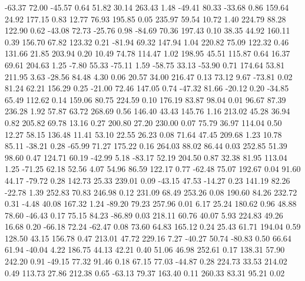   -63.37   72.00  -45.57    0.64
   51.82   30.14  263.43    1.48
  -49.41   80.33  -33.68    0.86
  159.64   24.92  177.15    0.83
   12.77   76.93  195.85    0.05
  235.97   59.54   10.72    1.40
  224.79   88.28  122.90    0.62
  -43.08   72.73  -25.76    0.98
  -84.69   70.36  197.43    0.10
   38.35   44.92  160.11    0.39
  156.70   67.82  123.32    0.21
  -81.94   69.32  147.94    1.04
  220.82   75.09  122.32    0.46
  131.66   21.85  203.94    0.20
   10.49   74.78  114.47    1.02
  198.95   45.51  115.87    0.64
   16.37   69.61  204.63    1.25
   -7.80   55.33  -75.11    1.59
  -58.75   33.13  -53.90    0.71
  174.64   53.81  211.95    3.63
  -28.56   84.48    4.30    0.06
   20.57   34.00  216.47    0.13
   73.12    9.67  -73.81    0.02
   81.24   62.21  156.29    0.25
  -21.00   72.46  147.05    0.74
  -47.32   81.66  -20.12    0.20
  -34.85   65.49  112.62    0.14
  159.06   80.75  224.59    0.10
  176.19   83.87   98.04    0.01
   96.67   87.39  236.28    1.92
   57.87   63.72  268.69    0.56
  146.40   43.43  145.76    1.16
  213.02   45.28   36.94    0.82
  205.82   69.78   13.16    0.27
  200.80   27.20  230.00    0.07
   75.79   36.97  114.04    0.50
   12.27   58.15  136.48   11.41
   53.10   22.55   26.23    0.08
   71.64   47.45  209.68    1.23
   10.78   85.11  -38.21    0.28
  -65.99   71.27  175.22    0.16
  264.03   88.02   86.44    0.03
  252.85   51.39   98.60    0.47
  124.71   60.19  -42.99    5.18
  -83.17   52.19  204.50    0.87
   32.38   81.95  113.04    1.25
  -71.25   62.18   52.56    4.07
   54.96   86.59  122.17    0.77
  -62.48   75.07  192.67    0.04
   91.60   44.17  -79.72    0.28
  142.73   25.33  239.01    0.09
  -43.15   47.53  -14.27    0.23
  141.19   82.26  -22.78    1.39
  252.83   70.83  246.98    0.12
  231.09   68.49  253.26    0.08
  190.60   84.26  232.72    0.31
   -4.48   40.08  167.32    1.24
  -89.20   79.23  257.96    0.01
    6.17   25.24  180.62    0.96
   48.88   78.60  -46.43    0.17
   75.15   84.23  -86.89    0.03
  218.11   60.76   40.07    5.93
  224.83   49.26   16.68    0.20
  -66.18   72.24  -62.47    0.08
   73.60   64.83  165.12    0.24
   25.43   61.71  194.04    0.59
  128.50   43.15  156.78    0.47
  213.01   47.72  229.16    7.27
  -40.27   50.74  -80.83    0.50
   66.64   61.94  -40.04    4.22
  186.75   44.13   42.21    0.40
   51.06   46.98  252.61    0.17
  138.31   57.90  242.20    0.91
  -49.15   77.32   91.46    0.18
   67.15   77.03  -44.87    0.28
  224.73   33.53  214.02    0.49
  113.73   27.86  212.38    0.65
  -63.13   79.37  163.40    0.11
  260.33   83.31   95.21    0.02
